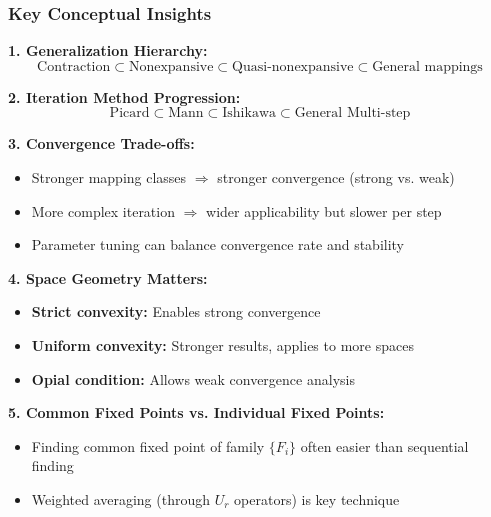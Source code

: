 \documentclass[aspectratio=169,10pt]{beamer}
\begin{document}
\begin{frame}
\frametitle{Key Conceptual Insights}

\textbf{1. Generalization Hierarchy:}
$$\text{Contraction} \subset \text{Nonexpansive} \subset \text{Quasi-nonexpansive} \subset \text{General mappings}$$

\vspace{0.3cm}

\textbf{2. Iteration Method Progression:}
$$\text{Picard} \subset \text{Mann} \subset \text{Ishikawa} \subset \text{General Multi-step}$$

\vspace{0.3cm}

\textbf{3. Convergence Trade-offs:}
\begin{itemize}
    \item Stronger mapping classes $\Rightarrow$ stronger convergence (strong vs. weak)
    \item More complex iteration $\Rightarrow$ wider applicability but slower per step
    \item Parameter tuning can balance convergence rate and stability
\end{itemize}

\vspace{0.3cm}

\textbf{4. Space Geometry Matters:}
\begin{itemize}
    \item \textbf{Strict convexity:} Enables strong convergence
    \item \textbf{Uniform convexity:} Stronger results, applies to more spaces
    \item \textbf{Opial condition:} Allows weak convergence analysis
\end{itemize}

\vspace{0.3cm}

\textbf{5. Common Fixed Points vs. Individual Fixed Points:}
\begin{itemize}
    \item Finding common fixed point of family $\{F_i\}$ often easier than sequential finding
    \item Weighted averaging (through $U_r$ operators) is key technique
\end{itemize}

\end{frame}
\end{document}
